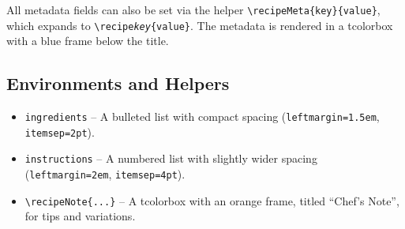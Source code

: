 All metadata fields can also be set via the helper
\texttt{\textbackslash recipeMeta\{key\}\{value\}}, which expands to
\texttt{\textbackslash recipe\textit{key}\{value\}}.  The metadata is
rendered in a tcolorbox with a blue frame below the title.

\subsection{Environments and Helpers}

\begin{itemize}
    \item \texttt{ingredients} -- A bulleted list with compact spacing
          (\texttt{leftmargin=1.5em}, \texttt{itemsep=2pt}).
    \item \texttt{instructions} -- A numbered list with slightly wider
          spacing (\texttt{leftmargin=2em}, \texttt{itemsep=4pt}).
    \item \texttt{\textbackslash recipeNote\{...\}} -- A tcolorbox with an
          orange frame, titled ``Chef's Note'', for tips and variations.
\end{itemize}
